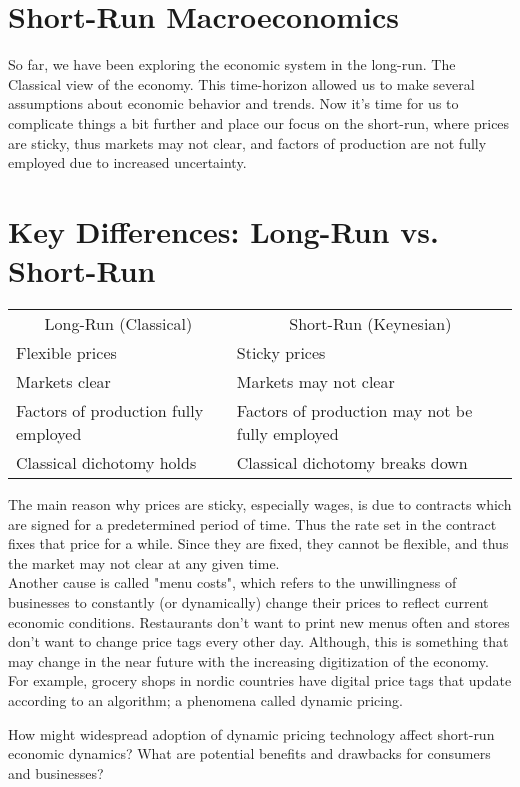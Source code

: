 \documentclass[10pt]{article}
\begin{document}
\section*{Short-Run Macroeconomics}
So far, we have been exploring the economic system in the long-run. The Classical view of the economy. This time-horizon allowed us to make several assumptions about economic behavior and trends. Now it's time for us to complicate things a bit further and place our focus on the short-run, where prices are sticky, thus markets may not clear, and factors of production are not fully employed due to increased uncertainty.

\section*{Key Differences: Long-Run vs. Short-Run}
\begin{center}
\begin{tabular}{ll}
\multicolumn{1}{c}{Long-Run (Classical)} & \multicolumn{1}{c}{Short-Run (Keynesian)} \\
Flexible prices & Sticky prices \\
Markets clear & Markets may not clear \\
Factors of production fully employed & Factors of production may not be fully employed \\
Classical dichotomy holds & Classical dichotomy breaks down \\
\end{tabular}
\end{center}

The main reason why prices are sticky, especially wages, is due to contracts which are signed for a predetermined period of time. Thus the rate set in the contract fixes that price for a while. Since they are fixed, they cannot be flexible, and thus the market may not clear at any given time.\\
Another cause is called "menu costs", which refers to the unwillingness of businesses to constantly (or dynamically) change their prices to reflect current economic conditions. Restaurants don't want to print new menus often and stores don't want to change price tags every other day. Although, this is something that may change in the near future with the increasing digitization of the economy. For example, grocery shops in nordic countries have digital price tags that update according to an algorithm; a phenomena called dynamic pricing.

How might widespread adoption of dynamic pricing technology affect short-run economic dynamics? What are potential benefits and drawbacks for consumers and businesses?
\end{document}
